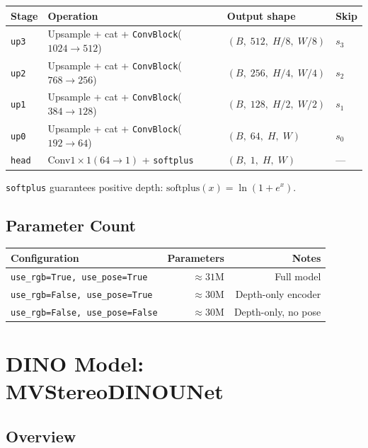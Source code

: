 \documentclass[11pt]{article}
\begin{document}
\begin{center}
\begin{tabular}{llll}
\toprule
\textbf{Stage} & \textbf{Operation} & \textbf{Output shape} & \textbf{Skip} \\
\midrule
\texttt{up3} & Upsample + cat + \texttt{ConvBlock}($1024 \to 512$) & $(B,\;512,\;H/8,\;W/8)$  & $s_3$ \\
\texttt{up2} & Upsample + cat + \texttt{ConvBlock}($768 \to 256$)  & $(B,\;256,\;H/4,\;W/4)$  & $s_2$ \\
\texttt{up1} & Upsample + cat + \texttt{ConvBlock}($384 \to 128$)  & $(B,\;128,\;H/2,\;W/2)$  & $s_1$ \\
\texttt{up0} & Upsample + cat + \texttt{ConvBlock}($192 \to 64$)   & $(B,\;64,\;H,\;W)$        & $s_0$ \\
\texttt{head}& Conv$1\times1(64 \to 1)$ + \texttt{softplus}        & $(B,\;1,\;H,\;W)$         & --- \\
\bottomrule
\end{tabular}
\end{center}

\texttt{softplus} guarantees positive depth:
$\text{softplus}(x) = \ln(1 + e^x)$.

\subsection{Parameter Count}

\begin{center}
\begin{tabular}{lrr}
\toprule
\textbf{Configuration} & \textbf{Parameters} & \textbf{Notes} \\
\midrule
\texttt{use\_rgb=True, use\_pose=True}  & $\approx 31$M & Full model \\
\texttt{use\_rgb=False, use\_pose=True} & $\approx 30$M & Depth-only encoder \\
\texttt{use\_rgb=False, use\_pose=False}& $\approx 30$M & Depth-only, no pose \\
\bottomrule
\end{tabular}
\end{center}

\section{\textcolor{dinogreen}{DINO Model: MVStereoDINOUNet}}

\subsection{Overview}
\end{document}
